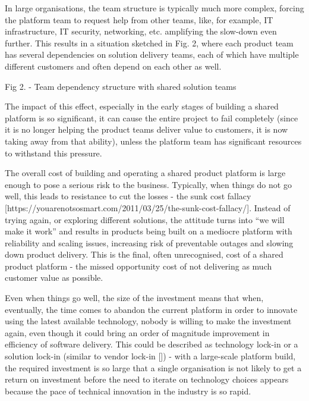 \documentclass[reprint,amsmath,amssymb,aps]{revtex4-1}
\begin{document}
In large organisations, the team structure is typically much more complex, forcing the platform team to request help from other teams, like, for example, IT infrastructure, IT security, networking, etc. amplifying the slow-down even further. This results in a situation sketched in Fig. 2, where each product team has several dependencies on solution delivery teams, each of which have multiple different customers and often depend on each other as well.  



Fig 2. - Team dependency structure with shared solution teams

The impact of this effect, especially in the early stages of building a shared platform is so significant, it can cause the entire project to fail completely (since it is no longer helping the product teams deliver value to customers, it is now taking away from that ability), unless the platform team has significant resources to withstand this pressure.

The overall cost of building and operating a shared product platform is large enough to pose a serious risk to the business. Typically, when things do not go well, this leads to resistance to cut the losses - the sunk cost fallacy [https://youarenotsosmart.com/2011/03/25/the-sunk-cost-fallacy/]. Instead of trying again, or exploring different solutions, the attitude turns into “we will make it work” and results in products being built on a mediocre platform with reliability and scaling issues, increasing risk of preventable outages and slowing down product delivery. This is the final, often unrecognised, cost of a shared product platform - the missed opportunity cost of not delivering as much customer value as possible.

Even when things go well, the size of the investment means that when, eventually, the time comes to abandon the current platform in order to innovate using the latest available technology, nobody is willing to make the investment again, even though it could bring an order of magnitude improvement in efficiency of software delivery. This could be described as technology lock-in or a solution lock-in (similar to vendor lock-in []) - with a large-scale platform build, the required investment is so large that a single organisation is not likely to get a return on investment before the need to iterate on technology choices appears because the pace of technical innovation in the industry is so rapid. 
\end{document}
